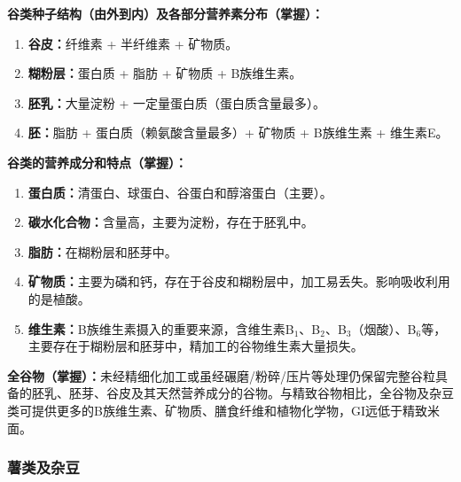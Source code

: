 \begin{keybox}
\textbf{谷类种子结构（由外到内）及各部分营养素分布（掌握）：}
\begin{enumerate}[leftmargin=*]
    \item \textbf{谷皮：}纤维素 + 半纤维素 + 矿物质。
    \item \textbf{糊粉层：}蛋白质 + 脂肪 + 矿物质 + B族维生素。
    \item \textbf{胚乳：}大量淀粉 + 一定量蛋白质（蛋白质含量最多）。
    \item \textbf{胚：}脂肪 + 蛋白质（赖氨酸含量最多）+ 矿物质 + B族维生素 + 维生素E。
\end{enumerate}
\end{keybox}

\begin{keybox}
\textbf{谷类的营养成分和特点（掌握）：}
\begin{enumerate}[leftmargin=*]
    \item \textbf{蛋白质：}清蛋白、球蛋白、谷蛋白和醇溶蛋白（主要）。
    \item \textbf{碳水化合物：}含量高，主要为淀粉，存在于胚乳中。
    \item \textbf{脂肪：}在糊粉层和胚芽中。
    \item \textbf{矿物质：}主要为磷和钙，存在于谷皮和糊粉层中，加工易丢失。影响吸收利用的是植酸。
    \item \textbf{维生素：}B族维生素摄入的重要来源，含维生素B$_1$、B$_2$、B$_3$（烟酸）、B$_6$等，主要存在于糊粉层和胚芽中，精加工的谷物维生素大量损失。
\end{enumerate}
\end{keybox}

\begin{keybox}
\textbf{全谷物（掌握）：}未经精细化加工或虽经碾磨/粉碎/压片等处理仍保留完整谷粒具备的胚乳、胚芽、谷皮及其天然营养成分的谷物。与精致谷物相比，全谷物及杂豆类可提供更多的B族维生素、矿物质、膳食纤维和植物化学物，GI远低于精致米面。
\end{keybox}

\subsubsection{薯类及杂豆}

